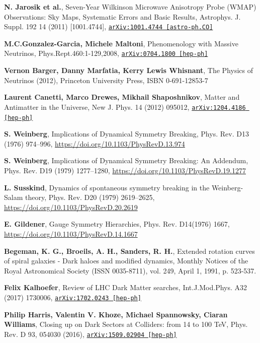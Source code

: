 \documentclass[11pt,a4paper,openright,twoside]{report}
\begin{document}
\begin{thebibliography}{9}
\textbf{N. Jarosik et al.}, Seven-Year Wilkinson Microwave Anisotropy Probe (WMAP) Observations: Sky Maps, Systematic Errors and Basic Results, Astrophys. J. Suppl. 192 14 (2011) [1001.4744], \href{https://arxiv.org/abs/1001.4744}{\texttt{arXiv:1001.4744 [astro-ph.CO]}}

\textbf{M.C.Gonzalez-Garcia, Michele Maltoni}, Phenomenology with Massive Neutrinos, Phys.Rept.460:1-129,2008, \href{https://arxiv.org/abs/0704.1800}{\texttt{arXiv:0704.1800 [hep-ph]}}

\textbf{Vernon Barger, Danny Marfatia, Kerry Lewis Whisnant}, The Physics of Neutrinos (2012), Princeton University Press, ISBN 0-691-12853-7

\textbf{Laurent Canetti, Marco Drewes, Mikhail Shaposhnikov}, Matter and Antimatter in the Universe, New J. Phys. 14 (2012) 095012, \href{https://arxiv.org/abs/1204.4186}{\texttt{arXiv:1204.4186 [hep-ph]}} 

\textbf{S. Weinberg}, Implications of Dynamical Symmetry Breaking, Phys. Rev. D13 (1976) 974–996, \url{https://doi.org/10.1103/PhysRevD.13.974}

\textbf{S. Weinberg}, Implications of Dynamical Symmetry Breaking:  An Addendum, Phys. Rev. D19 (1979) 1277–1280, \url{https://doi.org/10.1103/PhysRevD.19.1277}

\textbf{L. Susskind}, Dynamics of spontaneous symmetry breaking in the Weinberg-Salam theory, Phys. Rev. D20 (1979) 2619–2625, \url{https://doi.org/10.1103/PhysRevD.20.2619}

\textbf{E. Gildener}, Gauge Symmetry Hierarchies, Phys. Rev. D14(1976) 1667, \url{https://doi.org/10.1103/PhysRevD.14.1667}

	\textbf{Begeman, K. G., Broeils, A. H., Sanders, R. H.}, Extended rotation curves of spiral galaxies - Dark haloes and modified dynamics, Monthly Notices of the Royal Astronomical Society (ISSN 0035-8711), vol. 249, April 1, 1991, p. 523-537.
	
\textbf{Felix Kalhoefer}, Review of LHC Dark Matter searches, Int.J.Mod.Phys. A32 (2017) 1730006, \href{https://arxiv.org/abs/1702.02430}{\texttt{arXiv:1702.0243 [hep-ph]}}

\textbf{Philip Harris, Valentin V. Khoze, Michael Spannowsky, Ciaran Williams}, Closing up on Dark Sectors at Colliders: from 14 to 100 TeV, Phys. Rev. D 93, 054030 (2016), \href{https://arxiv.org/abs/1509.02904}{\texttt{arXiv:1509.02904 [hep-ph]}}


\end{thebibliography}
\end{document}
